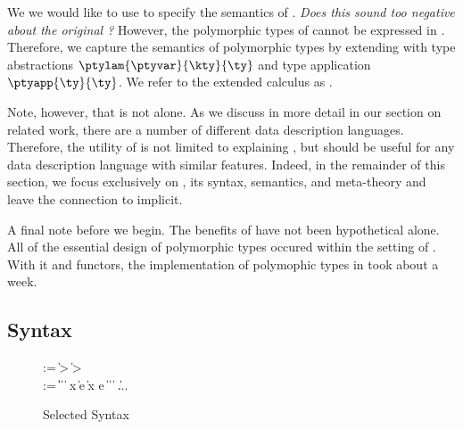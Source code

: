 We we would like to use \ddcold{} to specify the semantics of
\padsml{}. \emph{Does this sound too negative about the original
  \ddcold{}?}  However, the polymorphic types of \padsml{} cannot be
expressed in \ddcold{}. Therefore, we capture the
semantics of polymorphic types by extending \ddcold{} with type
abstractions $\ptylam{\ptyvar}{\kty}{\ty}$ and type application
$\ptyapp{\ty}{\ty}$. We refer to the extended calculus as \ddc{}.

Note, however, that \padsml{} is not alone. As we discuss in more
detail in our section on related work, there are a number of different
data description languages. Therefore, the utility of \ddc{} is not
limited to explaining \padsml{}, but should be useful for any data
description language with similar features. Indeed, in the remainder
of this section, we focus exclusively on \ddc{}, its syntax,
semantics, and meta-theory and leave the connection to \padsml{}
implicit.

A final note before we begin. The benefits of \ddc{} have not been
hypothetical alone. All of the essential design of polymorphic types
occured within the setting of \ddc{}. With it and \ocaml{} functors,
the implementation of polymophic types in \padsml{} took about a week.

\subsection{\ddc{} Syntax}
\begin{figure}
{\small
\begin{bnf}
   \meta{\gk} \::= \kty \| \ity \-> \gk 
                               \| \kty \-> \gk \\
   \meta{\ty} \::= 
    \ptrue\| \pfalse \|  \| 
    \plam{\var}{\ity}{\ty} \|  \nlalt
    \psig x \ty \ty \| \psum \ty e \ty \|
    \pset x \ty e \nlalt
    \ptyvar \| \pmu{\ptyvar}{\gk}{\ty} \| 
    \ptylam{\ptyvar}{\kty}{\ty} \| \ptyapp{\ty}{\ty} \| ...
\end{bnf}
}
\caption{Selected \ddc{} Syntax}
\label{fig:ddc-syntax}
\end{figure}

